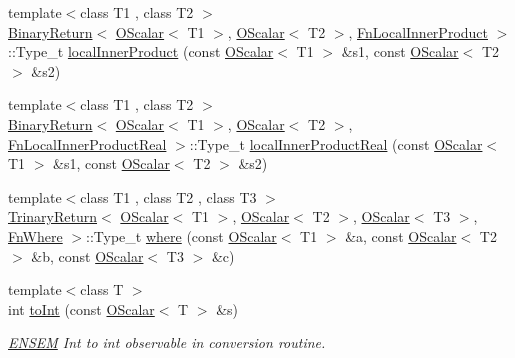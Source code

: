 \begin{DoxyCompactItemize}
\item 
{\footnotesize template$<$class T1 , class T2 $>$ }\\\mbox{\hyperlink{structENSEM_1_1BinaryReturn}{Binary\+Return}}$<$ \mbox{\hyperlink{classENSEM_1_1OScalar}{O\+Scalar}}$<$ T1 $>$, \mbox{\hyperlink{classENSEM_1_1OScalar}{O\+Scalar}}$<$ T2 $>$, \mbox{\hyperlink{structENSEM_1_1FnLocalInnerProduct}{Fn\+Local\+Inner\+Product}} $>$\+::Type\+\_\+t \mbox{\hyperlink{group__obsscalar_ga17966d3d3b6922670f83bb3f96b1cd76}{local\+Inner\+Product}} (const \mbox{\hyperlink{classENSEM_1_1OScalar}{O\+Scalar}}$<$ T1 $>$ \&s1, const \mbox{\hyperlink{classENSEM_1_1OScalar}{O\+Scalar}}$<$ T2 $>$ \&s2)
\item 
{\footnotesize template$<$class T1 , class T2 $>$ }\\\mbox{\hyperlink{structENSEM_1_1BinaryReturn}{Binary\+Return}}$<$ \mbox{\hyperlink{classENSEM_1_1OScalar}{O\+Scalar}}$<$ T1 $>$, \mbox{\hyperlink{classENSEM_1_1OScalar}{O\+Scalar}}$<$ T2 $>$, \mbox{\hyperlink{structENSEM_1_1FnLocalInnerProductReal}{Fn\+Local\+Inner\+Product\+Real}} $>$\+::Type\+\_\+t \mbox{\hyperlink{group__obsscalar_ga83c87e37c0e8b624401c37ff72a5f23c}{local\+Inner\+Product\+Real}} (const \mbox{\hyperlink{classENSEM_1_1OScalar}{O\+Scalar}}$<$ T1 $>$ \&s1, const \mbox{\hyperlink{classENSEM_1_1OScalar}{O\+Scalar}}$<$ T2 $>$ \&s2)
\item 
{\footnotesize template$<$class T1 , class T2 , class T3 $>$ }\\\mbox{\hyperlink{structENSEM_1_1TrinaryReturn}{Trinary\+Return}}$<$ \mbox{\hyperlink{classENSEM_1_1OScalar}{O\+Scalar}}$<$ T1 $>$, \mbox{\hyperlink{classENSEM_1_1OScalar}{O\+Scalar}}$<$ T2 $>$, \mbox{\hyperlink{classENSEM_1_1OScalar}{O\+Scalar}}$<$ T3 $>$, \mbox{\hyperlink{structENSEM_1_1FnWhere}{Fn\+Where}} $>$\+::Type\+\_\+t \mbox{\hyperlink{group__obsscalar_gacb54937c6368c2a99fd2eaecc1221360}{where}} (const \mbox{\hyperlink{classENSEM_1_1OScalar}{O\+Scalar}}$<$ T1 $>$ \&a, const \mbox{\hyperlink{classENSEM_1_1OScalar}{O\+Scalar}}$<$ T2 $>$ \&b, const \mbox{\hyperlink{classENSEM_1_1OScalar}{O\+Scalar}}$<$ T3 $>$ \&c)
\item 
{\footnotesize template$<$class T $>$ }\\int \mbox{\hyperlink{group__obsscalar_ga700ca25f1dbaeb36065859d474b4dbeb}{to\+Int}} (const \mbox{\hyperlink{classENSEM_1_1OScalar}{O\+Scalar}}$<$ T $>$ \&s)
\begin{DoxyCompactList}\small\item\em \mbox{\hyperlink{namespaceENSEM}{E\+N\+S\+EM}} Int to int observable in conversion routine. \end{DoxyCompactList}\item 

\end{DoxyCompactItemize}
